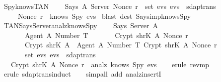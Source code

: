 \begin{isabellebody}
  \endisatagproof
  {\isafoldproof}%
  \isadelimproof
  \isanewline
  \endisadelimproof
  \isanewline
  \isamarkupfalse%
  \ Spy{\isacharunderscore}knows{\isacharunderscore}TAN\ {\isacharcolon}\isanewline
  \ \ {\isachardoublequoteopen}{\isasymlbrakk}\ Says\ A\ Server\ {\isacharparenleft}Nonce\ r{\isacharparenright}\ {\isasymin}\ set\ evs{\isacharsemicolon}\ evs\ {\isasymin}\ sdaptrans\ {\isasymrbrakk}\isanewline
  \ \ \ \ {\isasymLongrightarrow}\ Nonce\ r\ {\isasymin}\ knows\ Spy\ evs{\isachardoublequoteclose}\isanewline
  \isadelimproof
  \endisadelimproof
  \isatagproof
  \isamarkupfalse%
  \ {\isacharparenleft}blast\ dest{\isacharbang}{\isacharcolon}\ Says{\isacharunderscore}imp{\isacharunderscore}knows{\isacharunderscore}Spy{\isacharparenright}%
  \endisatagproof
  {\isafoldproof}%
  \isadelimproof
  \isanewline
  \endisadelimproof
  \isanewline
  \isamarkupfalse%
  \ TAN{\isacharunderscore}Says{\isacharunderscore}Server{\isacharunderscore}analz{\isacharunderscore}knows{\isacharunderscore}Spy\ {\isacharcolon}\isanewline
  \ \ {\isachardoublequoteopen}{\isasymlbrakk}\ Says\ Server\ A\ {\isasymlbrace}\isanewline
  \ \ \ \ \ \ \ {\isasymlbrace}Agent\ A{\isacharcomma}\ Number\ T{\isasymrbrace}{\isacharcomma}\isanewline
  \ \ \ \ \ \ \ Crypt\ {\isacharparenleft}shrK\ A{\isacharparenright}\ {\isacharparenleft}Nonce\ r{\isacharparenright}{\isacharcomma}\isanewline
  \ \ \ \ \ \ \ Crypt\ {\isacharparenleft}shrK\ A{\isacharparenright}\ {\isasymlbrace}\ {\isasymlbrace}Agent\ A{\isacharcomma}\ Number\ T{\isasymrbrace}{\isacharcomma}\ Crypt\ {\isacharparenleft}shrK\ A{\isacharparenright}\ {\isacharparenleft}Nonce\ r{\isacharparenright}\ {\isasymrbrace}\isanewline
  \ \ \ \ \ {\isasymrbrace}\ {\isasymin}\ set\ evs{\isacharsemicolon}\ evs\ {\isasymin}\ sdaptrans\ {\isasymrbrakk}\isanewline
  \ \ {\isasymLongrightarrow}\ Crypt\ {\isacharparenleft}shrK\ A{\isacharparenright}\ {\isacharparenleft}Nonce\ r{\isacharparenright}\ {\isasymin}\ analz\ {\isacharparenleft}knows\ Spy\ evs{\isacharparenright}{\isachardoublequoteclose}\isanewline
  \isadelimproof
  \isanewline
  \ \ %
  \endisadelimproof
  \isatagproof
  \isamarkupfalse%
  \ {\isacharparenleft}erule\ rev{\isacharunderscore}mp{\isacharparenright}\isanewline
  \ \ \isamarkupfalse%
  \ {\isacharparenleft}erule\ sdaptrans{\isachardot}induct{\isacharparenright}\isanewline
  \ \ \isamarkupfalse%
  \ {\isacharparenleft}simp{\isacharunderscore}all\ add{\isacharcolon}\ analz{\isacharunderscore}insertI{\isacharparenright}\isanewline

\end{isabellebody}
